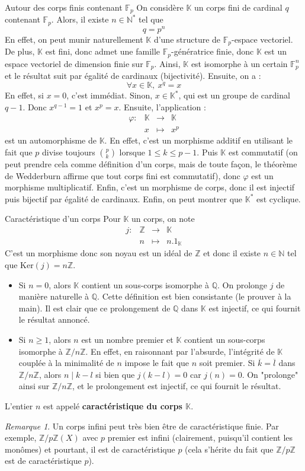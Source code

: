 \documentclass[french]{book}
\newcommand{\N}{\mathbb{N}}
\newcommand{\Z}{\mathbb{Z}}
\newcommand{\Q}{\mathbb{Q}}
\newcommand{\K}{\mathbb{K}}
\newcommand{\st}{^*}
\newcommand{\F}{\mathbb{F}}
\renewcommand{\ker}{\text{Ker}}
\theoremstyle{plain}
\theoremstyle{definition}
\theoremstyle{remark}
\newtheorem*{rmq}{Remarque}
\begin{document}
\begin{AS}{Autour des corps finis contenant $\F_p$}
On considère $\K$ un corps fini de cardinal $q$ contenant $\F_p$. Alors, il existe $n\in\N\st$ tel que $$q=p^n$$ En effet, on peut munir naturellement $\K$ d'une structure de $\F_p$-espace vectoriel. De plus, $\K$ est fini, donc admet une famille $\F_p$-génératrice finie, donc $\K$ est un espace vectoriel de dimension finie sur $\F_p$. Ainsi, $\K$ est isomorphe à un certain $\F_p^n$ et le résultat suit par égalité de cardinaux (bijectivité). Ensuite, on a : $$\forall x\in\K,\ x^q=x$$ En effet, si $x=0$, c'est immédiat. Sinon, $x\in\K\st$, qui est un groupe de cardinal $q-1$. Donc $x^{q-1}=1$ et $x^p=x$. Ensuite, l'application : $$\begin{array}{lrcl}
	\varphi:&\K&\longrightarrow&\K\\
	&x&\longmapsto&x^p
\end{array}$$ est un automorphisme de $\K$. En effet, c'est un morphisme additif en utilisant le fait que $p$ divise toujours $\binom{p}{k}$ lorsque $1\leqslant k\leqslant p-1$. Puis $\K$ est commutatif (on peut prendre cela comme définition d'un corps, mais de toute façon, le théorème de Wedderburn affirme que tout corps fini est commutatif), donc $\varphi$ est un morphisme multiplicatif. Enfin, c'est un morphisme de corps, donc il est injectif puis bijectif par égalité de cardinaux. Enfin, on peut montrer que $\K\st$ est cyclique.
\end{AS}
\begin{AS}{Caractéristique d'un corps} Pour $\K$ un corps, on note $$\begin{array}{lrcl}
	j:&\Z&\longrightarrow&\K \\
	&n&\longmapsto&n.1_\K
\end{array}$$ C'est un morphisme donc son noyau est un idéal de $\Z$ et donc il existe $n\in\N$ tel que $\ker(j)=n\Z$.
\begin{itemize}
	\item Si $n=0$, alors $\K$ contient un sous-corps isomorphe à $\Q$. On prolonge $j$ de manière naturelle à $\Q$. Cette définition est bien consistante (le prouver à la main). Il est clair que ce prolongement de $\Q$ dans $\K$ est injectif, ce qui fournit le résultat annoncé.
	\item Si $n\geqslant1$, alors $n$ est un nombre premier et $\K$ contient un sous-corps isomorphe à $\Z/n\Z$. En effet, en raisonnant par l'absurde, l'intégrité de $\K$ couplée à la minimalité de $n$ impose le fait que $n$ soit premier. Si $\overline{k}=\overline{l}$ dans $\Z/n\Z$, alors $n\mid k-l$ si bien que $j(k-l)=0$ car $j(n)=0$. On "prolonge" ainsi sur $\Z/n\Z$, et le prolongement est injectif, ce qui fournit le résultat.
\end{itemize}
L'entier $n$ est appelé \textbf{caractéristique du corps $\K$}.
\end{AS}
\begin{rmq}
	Un corps infini peut très bien être de caractéristique finie. Par exemple, $\Z/p\Z(X)$ avec $p$ premier est infini (clairement, puisqu'il contient les monômes) et pourtant, il est de caractéristique $p$ (cela s'hérite du fait que $\Z/p\Z$ est de caractéristique $p$).
\end{rmq}
\end{document}
